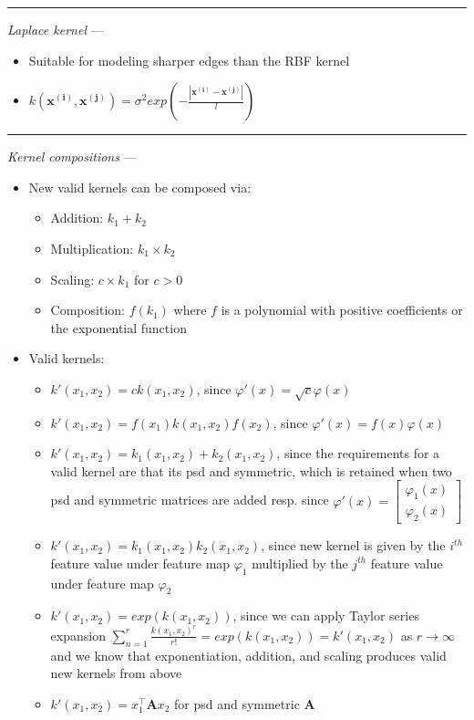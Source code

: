 {\color{lightgray}\hrule height 0.001mm}

\emph{Laplace kernel} ---
\begin{itemize}
    \item Suitable for modeling sharper edges than the RBF kernel
    \item $k( \boldsymbol{x^{(i)}}, \boldsymbol{x^{(j)}} ) = \sigma^2 exp (- \frac{ | \boldsymbol{x^{(i)}} - \boldsymbol{x^{(j)}} | }{ l } )$
\end{itemize}

{\color{lightgray}\hrule height 0.001mm}

\emph{Kernel compositions} ---
\begin{itemize}
    \item New valid kernels can be composed via:
    \begin{itemize}
        \item Addition: $k_1 + k_2$
        \item Multiplication: $k_1 \times k_2$
        \item Scaling: $c \times k_1$ for $c > 0$
        \item Composition: $f(k_1)$ where $f$ is a polynomial with positive coefficients or the exponential function
    \end{itemize}
    \item Valid kernels:
    \begin{itemize}
        \item $k'(x_1,x_2) = c k(x_1,x_2)$, since $\varphi'(x) = \sqrt{c}\varphi(x)$
        \item $k'(x_1,x_2) = f(x_1) k(x_1,x_2) f(x_2)$, since $\varphi'(x) = f(x)\varphi(x)$
        \item $k'(x_1,x_2) = k_1(x_1,x_2) + k_2(x_1,x_2)$, since the requirements for a valid kernel are that its psd and symmetric, which is retained when two psd and symmetric matrices are added resp. since $\varphi'(x) = 
        \begin{bmatrix} 
        \varphi_1(x)\\
        \varphi_2(x)
        \end{bmatrix}$
        \item $k'(x_1,x_2) = k_1(x_1,x_2) k_2(x_1,x_2)$, since new kernel is given by the $i^{th}$ feature value under feature map $\varphi_1$ multiplied by the $j^{th}$ feature value under feature map $\varphi_2$
        \item $k'(x_1,x_2) = exp(k(x_1,x_2))$, since we can apply Taylor series expansion $\sum_{n=1}^r \frac{k(x_1,x_2)^r}{r!} = exp(k(x_1,x_2)) = k'(x_1,x_2)$ as $r \rightarrow \infty$ and we know that exponentiation, addition, and scaling produces valid new kernels from above
        \item $k'(x_1,x_2) = x_1^\intercal \boldsymbol{A} x_2 $ for psd and symmetric $\boldsymbol{A}$
    \end{itemize}
\end{itemize}

